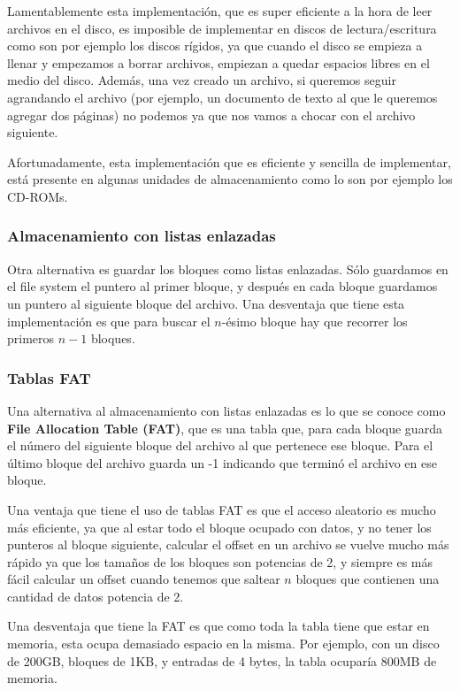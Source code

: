 \documentclass{article}
\begin{document}
Lamentablemente esta implementaci\'on, que es super eficiente a la hora de leer archivos en el disco, es imposible de implementar en discos de lectura/escritura como son por ejemplo los discos r\'igidos, ya que cuando el disco se empieza a llenar y empezamos a borrar archivos, empiezan a quedar espacios libres en el medio del disco. Adem\'as, una vez creado un archivo, si queremos seguir agrandando el archivo (por ejemplo, un documento de texto al que le queremos agregar dos p\'aginas) no podemos ya que nos vamos a chocar con el archivo siguiente.

Afortunadamente, esta implementaci\'on que es eficiente y sencilla de implementar, est\'a presente en algunas unidades de almacenamiento como lo son por ejemplo los CD-ROMs.

\subsubsection{Almacenamiento con listas enlazadas}

Otra alternativa es guardar los bloques como listas enlazadas. S\'olo guardamos en el file system el puntero al primer bloque, y despu\'es en cada bloque guardamos un puntero al siguiente bloque del archivo. Una desventaja que tiene esta implementaci\'on es que para buscar el $n$-\'esimo bloque hay que recorrer los primeros $n-1$ bloques.

\subsubsection{Tablas FAT}

Una alternativa al almacenamiento con listas enlazadas es lo que se conoce como \textbf{File Allocation Table (FAT)}, que es una tabla que, para cada bloque guarda el n\'umero del siguiente bloque del archivo al que pertenece ese bloque. Para el \'ultimo bloque del archivo guarda un -1 indicando que termin\'o el archivo en ese bloque.

Una ventaja que tiene el uso de tablas FAT es que el acceso aleatorio es mucho m\'as eficiente, ya que al estar todo el bloque ocupado con datos, y no tener los punteros al bloque siguiente, calcular el offset en un archivo se vuelve mucho m\'as r\'apido ya que los tama\~nos de los bloques son potencias de 2, y siempre es m\'as f\'acil calcular un offset cuando tenemos que saltear $n$ bloques que contienen una cantidad de datos potencia de 2.

Una desventaja que tiene la FAT es que como toda la tabla tiene que estar en memoria, esta ocupa demasiado espacio en la misma. Por ejemplo, con un disco de 200GB, bloques de 1KB, y entradas de 4 bytes, la tabla ocupar\'ia 800MB de memoria.
\end{document}

